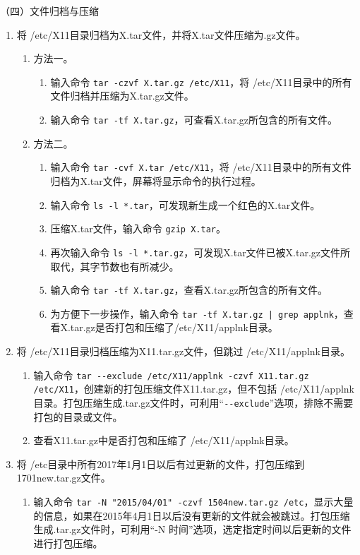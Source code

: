 \vspace{0.1in}
（四）文件归档与压缩
\begin{enumerate}
  \item 将 /etc/X11目录归档为X.tar文件，并将X.tar文件压缩为.gz文件。
    \begin{enumerate}
      \item 方法一。
	\begin{enumerate}
	  \item 输入命令 \verb|tar -czvf X.tar.gz /etc/X11|，将 /etc/X11目录中的所有文件归档并压缩为X.tar.gz文件。
	  \item 输入命令 \verb|tar -tf X.tar.gz|，可查看X.tar.gz所包含的所有文件。
	\end{enumerate}
      \item 方法二。
	\begin{enumerate}
	  \item 输入命令 \verb|tar -cvf X.tar /etc/X11|，将 /etc/X11目录中的所有文件归档为X.tar文件，屏幕将显示命令的执行过程。
	  \item 输入命令 \verb|ls -l *.tar|，可发现新生成一个红色的X.tar文件。
	  \item 压缩X.tar文件，输入命令 \verb|gzip X.tar|。
	  \item 再次输入命令 \verb|ls -l *.tar.gz|，可发现X.tar文件已被X.tar.gz文件所取代，其字节数也有所减少。
	  \item 输入命令 \verb|tar -tf X.tar.gz|，查看X.tar.gz所包含的所有文件。
	  \item 为方便下一步操作，输入命令 \verb=tar -tf X.tar.gz | grep applnk=，查看X.tar.gz是否打包和压缩了/etc/X11/applnk目录。
	\end{enumerate}
    \end{enumerate}
  \item 将 /etc/X11目录归档压缩为X11.tar.gz文件，但跳过 /etc/X11/applnk目录。
    \begin{enumerate}
      \item 输入命令 \verb|tar --exclude /etc/X11/applnk -czvf X11.tar.gz /etc/X11|，创建新的打包压缩文件X11.tar.gz，但不包括 /etc/X11/applnk目录。打包压缩生成.tar.gz文件时，可利用“\verb|--exclude|”选项，排除不需要打包的目录或文件。
      \item 查看X11.tar.gz中是否打包和压缩了 /etc/X11/applnk目录。
    \end{enumerate}
  \item 将 /etc目录中所有2017年1月1日以后有过更新的文件，打包压缩到1701new.tar.gz文件。
    \begin{enumerate}
      \item 输入命令 \verb|tar -N "2015/04/01" -czvf 1504new.tar.gz /etc|，显示大量的信息，如果在2015年4月1日以后没有更新的文件就会被跳过。打包压缩生成.tar.gz文件时，可利用“-N 时间”选项，选定指定时间以后更新的文件进行打包压缩。

\end{enumerate}
\end{enumerate}
